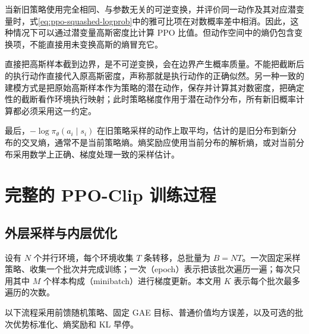 \documentclass[UTF8]{ctexart}
\begin{document}
当新旧策略使用完全相同、与参数无关的可逆变换，并评价同一动作及其对应潜变量时，式\eqref{eq:ppo-squashed-logprob}中的雅可比项在对数概率差中相消。因此，这种情况下可以通过潜变量高斯密度比计算 PPO 比值。但动作空间中的熵仍包含变换项，不能直接用未变换高斯的熵冒充它。

直接把高斯样本截到边界，是不可逆变换，会在边界产生概率质量。不能把截断后的执行动作直接代入原高斯密度，声称那就是执行动作的正确似然。另一种一致的建模方式是把原始高斯样本作为策略的潜在动作，保存并计算其对数密度，把确定性的截断看作环境执行映射；此时策略梯度作用于潜在动作分布，所有新旧概率计算都必须采用这一约定。

最后，$-\log\pi_\theta(a_i\mid s_i)$ 在旧策略采样的动作上取平均，估计的是旧分布到新分布的交叉熵，通常不是当前策略熵。熵奖励应使用当前分布的解析熵，或对当前分布采用数学上正确、梯度处理一致的采样估计。

\section{完整的 PPO-Clip 训练过程}
\label{sec:ppo-algorithm}

\subsection{外层采样与内层优化}

设有 $N$ 个并行环境，每个环境收集 $T$ 条转移，总批量为 $B=NT$。一次固定采样策略、收集一个批次并完成训练；一次（epoch）表示把该批次遍历一遍；每次只用其中 $M$ 个样本构成（minibatch）进行梯度更新。本文用 $K$ 表示每个批次最多遍历的次数。

以下流程采用前馈随机策略、固定 GAE 目标、普通价值均方误差，以及可选的批次优势标准化、熵奖励和 KL 早停。
\end{document}
